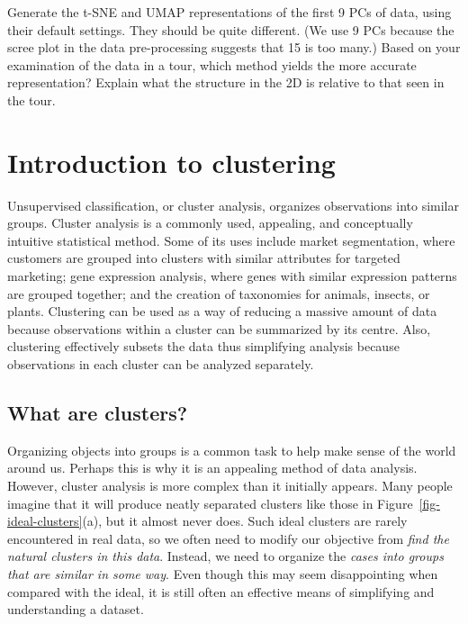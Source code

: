 \documentclass[
  letterpaper,
]{krantz}
\begin{document}
Generate the t-SNE and UMAP representations of the first 9 PCs of data,
using their default settings. They should be quite different. (We use 9
PCs because the scree plot in the data pre-processing suggests that 15
is too many.) Based on your examination of the data in a tour, which
method yields the more accurate representation? Explain what the
structure in the 2D is relative to that seen in the tour.


\chapter{Introduction to clustering}\label{introduction-to-clustering}

Unsupervised classification, or cluster analysis, organizes observations
into similar groups. Cluster analysis is a commonly used, appealing, and
conceptually intuitive statistical method. Some of its uses include
market segmentation, where customers are grouped into clusters with
similar attributes for targeted marketing; gene expression analysis,
where genes with similar expression patterns are grouped together; and
the creation of taxonomies for animals, insects, or plants. Clustering
can be used as a way of reducing a massive amount of data because
observations within a cluster can be summarized by its centre. Also,
clustering effectively subsets the data thus simplifying analysis
because observations in each cluster can be analyzed separately.

\section{What are clusters?}\label{what-are-clusters}

Organizing objects into groups is a common task to help make sense of
the world around us. Perhaps this is why it is an appealing method of
data analysis. However, cluster analysis is more complex than it
initially appears. Many people imagine that it will produce neatly
separated clusters like those in Figure~\ref{fig-ideal-clusters}(a), but
it almost never does. Such ideal clusters are rarely encountered in real
data, so we often need to modify our objective from \emph{find the
natural clusters in this data}. Instead, we need to organize the
\emph{cases into groups that are similar in some way}. Even though this
may seem disappointing when compared with the ideal, it is still often
an effective means of simplifying and understanding a dataset.
\end{document}
